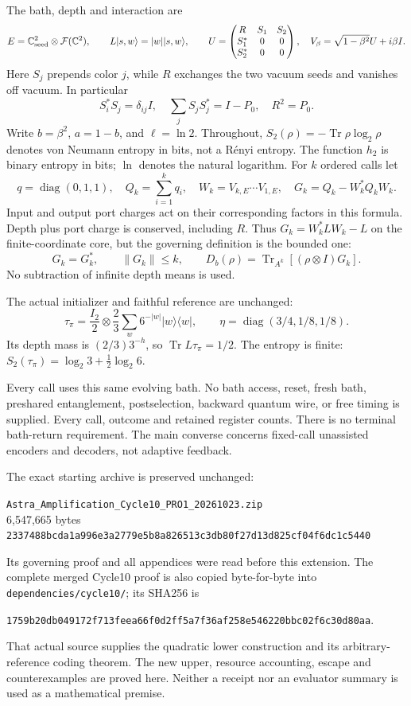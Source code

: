 \documentclass[11pt]{article}
\newcommand{\Tr}{\operatorname{Tr}}
\newcommand{\ket}[1]{\lvert #1\rangle}
\newcommand{\bra}[1]{\langle #1\rvert}
\newcommand{\norm}[1]{\lVert #1\rVert}
\begin{document}
The bath, depth and interaction are
\[
 E=\mathbb C^2_{\rm seed}\otimes\mathcal F(\mathbb C^2),\qquad
 L\ket{s,w}=|w|\ket{s,w},\qquad
 U=\begin{pmatrix}R&S_1&S_2\\S_1^*&0&0\\S_2^*&0&0\end{pmatrix},
 \quad V_\beta=\sqrt{1-\beta^2}U+i\beta I.
\]
Here \(S_j\) prepends color \(j\), while \(R\) exchanges the two vacuum
seeds and vanishes off vacuum. In particular
\[
 S_i^*S_j=\delta_{ij}I,\quad
 \sum_jS_jS_j^*=I-P_0,\quad R^2=P_0.
\]
Write \(b=\beta^2\), \(a=1-b\), and \(\ell=\ln2\).
Throughout, \(S_2(\rho)=-\Tr\rho\log_2\rho\) denotes von Neumann
entropy in bits, not a R\'enyi entropy. The function \(h_2\) is binary
entropy in bits; \(\ln\) denotes the natural logarithm.
For \(k\) ordered calls let
\[
 q=\operatorname{diag}(0,1,1),\quad Q_k=\sum_{i=1}^kq_i,\quad
 W_k=V_{k,E}\cdots V_{1,E},\quad
 G_k=Q_k-W_k^*Q_kW_k.
\]
Input and output port charges act on their corresponding factors in this
formula. Depth plus port charge is conserved, including \(R\).
Thus \(G_k=W_k^*LW_k-L\) on the finite-coordinate core, but the governing
definition is the bounded one:
\[
 G_k=G_k^*,\qquad \norm{G_k}\le k,\qquad
 D_b(\rho)=\Tr_{A^k}[(\rho\otimes I)G_k].
\]
No subtraction of infinite depth means is used.

The actual initializer and faithful reference are unchanged:
\[
 \tau_\pi=\frac{I_2}{2}\otimes\frac23\sum_w6^{-|w|}\ket w\bra w,
 \qquad \eta=\operatorname{diag}(3/4,1/8,1/8).
\]
Its depth mass is \((2/3)3^{-h}\), so \(\Tr L\tau_\pi=1/2\).
The entropy is finite:
\(S_2(\tau_\pi)=\log_2 3+\tfrac12\log_2 6\).

Every call uses this same evolving bath. No bath access, reset, fresh bath,
preshared entanglement, postselection, backward quantum wire, or free timing
is supplied. Every call, outcome and retained register counts. There is
no terminal bath-return requirement. The main converse concerns
fixed-call unassisted encoders and decoders, not adaptive feedback.

The exact starting archive is preserved unchanged:
\begin{center}\small
\texttt{Astra\_Amplification\_Cycle10\_PRO1\_20261023.zip}\\
6,547,665 bytes\\
\texttt{2337488bcda1a996e3a2779e5b8a826513c3db80f27d13d825cf04f6dc1c5440}
\end{center}
Its governing proof and all appendices were read before this extension.
The complete merged Cycle10 proof is also copied byte-for-byte into
\texttt{dependencies/cycle10/}; its SHA256 is
\begin{center}\small
\texttt{1759b20db049172f713feea66f0d2ff5a7f36af258e546220bbc02f6c30d80aa}.
\end{center}
That actual source supplies the quadratic lower construction and its
arbitrary-reference coding theorem. The new upper, resource accounting,
escape and counterexamples are proved here. Neither a receipt nor an
evaluator summary is used as a mathematical premise.
\end{document}
